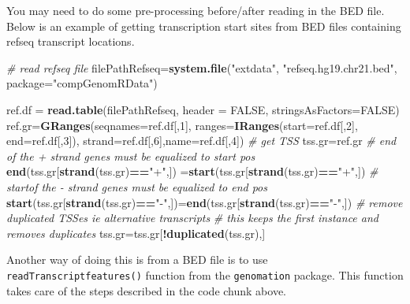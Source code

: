 \documentclass[12pt,]{krantz}
\newenvironment{Shaded}{\begin{snugshade}}{\end{snugshade}}
\newcommand{\CommentTok}[1]{\textcolor[rgb]{0.56,0.35,0.01}{\textit{#1}}}
\newcommand{\DataTypeTok}[1]{\textcolor[rgb]{0.13,0.29,0.53}{#1}}
\newcommand{\DecValTok}[1]{\textcolor[rgb]{0.00,0.00,0.81}{#1}}
\newcommand{\KeywordTok}[1]{\textcolor[rgb]{0.13,0.29,0.53}{\textbf{#1}}}
\newcommand{\NormalTok}[1]{#1}
\newcommand{\OperatorTok}[1]{\textcolor[rgb]{0.81,0.36,0.00}{\textbf{#1}}}
\newcommand{\OtherTok}[1]{\textcolor[rgb]{0.56,0.35,0.01}{#1}}
\newcommand{\StringTok}[1]{\textcolor[rgb]{0.31,0.60,0.02}{#1}}
\begin{document}
You may need to do some pre-processing before/after reading in the BED file. Below is an example of getting transcription start sites from BED files containing refseq transcript locations.

\begin{Shaded}
\begin{Highlighting}[]
\CommentTok{# read refseq file}
\NormalTok{filePathRefseq=}\KeywordTok{system.file}\NormalTok{(}\StringTok{"extdata"}\NormalTok{,}
                      \StringTok{"refseq.hg19.chr21.bed"}\NormalTok{,}
                      \DataTypeTok{package=}\StringTok{"compGenomRData"}\NormalTok{)}


\NormalTok{ref.df =}\StringTok{ }\KeywordTok{read.table}\NormalTok{(filePathRefseq, }\DataTypeTok{header =} \OtherTok{FALSE}\NormalTok{,}
                     \DataTypeTok{stringsAsFactors=}\OtherTok{FALSE}\NormalTok{) }
\NormalTok{ref.gr=}\KeywordTok{GRanges}\NormalTok{(}\DataTypeTok{seqnames=}\NormalTok{ref.df[,}\DecValTok{1}\NormalTok{],}
               \DataTypeTok{ranges=}\KeywordTok{IRanges}\NormalTok{(}\DataTypeTok{start=}\NormalTok{ref.df[,}\DecValTok{2}\NormalTok{],}
                              \DataTypeTok{end=}\NormalTok{ref.df[,}\DecValTok{3}\NormalTok{]),}
               \DataTypeTok{strand=}\NormalTok{ref.df[,}\DecValTok{6}\NormalTok{],}\DataTypeTok{name=}\NormalTok{ref.df[,}\DecValTok{4}\NormalTok{])}
\CommentTok{# get TSS}
\NormalTok{tss.gr=ref.gr}
\CommentTok{# end of the + strand genes must be equalized to start pos}
\KeywordTok{end}\NormalTok{(tss.gr[}\KeywordTok{strand}\NormalTok{(tss.gr)}\OperatorTok{==}\StringTok{"+"}\NormalTok{,])  =}\KeywordTok{start}\NormalTok{(tss.gr[}\KeywordTok{strand}\NormalTok{(tss.gr)}\OperatorTok{==}\StringTok{"+"}\NormalTok{,])}
\CommentTok{# startof the - strand genes must be equalized to end pos}
\KeywordTok{start}\NormalTok{(tss.gr[}\KeywordTok{strand}\NormalTok{(tss.gr)}\OperatorTok{==}\StringTok{"-"}\NormalTok{,])=}\KeywordTok{end}\NormalTok{(tss.gr[}\KeywordTok{strand}\NormalTok{(tss.gr)}\OperatorTok{==}\StringTok{"-"}\NormalTok{,])}
\CommentTok{# remove duplicated TSSes ie alternative transcripts}
\CommentTok{# this keeps the first instance and removes duplicates}
\NormalTok{tss.gr=tss.gr[}\OperatorTok{!}\KeywordTok{duplicated}\NormalTok{(tss.gr),]}
\end{Highlighting}
\end{Shaded}

Another way of doing this is from a BED file is to use \texttt{readTranscriptfeatures()}
function from the \texttt{genomation} package. This function takes care of the steps described in the code chunk above.
\end{document}
